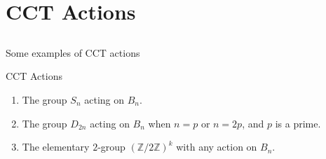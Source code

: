 \documentclass{beamer}
\newtheorem{lem}[thm]{Lemma}
\theoremstyle{remark}
\begin{document}
\section{CCT Actions}
\subsection{}






\begin{frame}{Some examples of CCT actions}
\begin{block}{CCT Actions}
\begin{enumerate}
\item The group $S_n$ acting on $B_n$.
\item The group $D_{2n}$ acting on $B_{n}$ when $n = p$ or $n = 2p$, and $p$ is a prime.
\item The elementary $2$-group $(\mathbb Z /2 \mathbb Z)^k$ with any action on $B_n$.
\end{enumerate}
\end{block}
\end{frame}
\end{document}
